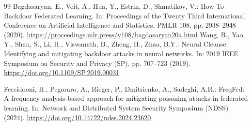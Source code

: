 \documentclass[runningheads,orivec]{llncs}
\begin{document}
\begin{thebibliography}{99}
     Bagdasaryan, E., Veit, A., Hua, Y., Estrin, D., Shmatikov, V.: How To Backdoor Federated Learning. In: Proceedings of the Twenty Third International Conference on Artificial Intelligence and Statistics, PMLR 108, pp. 2938--2948 (2020). \url{https://proceedings.mlr.press/v108/bagdasaryan20a.html}
     Wang, B., Yao, Y., Shan, S., Li, H., Viswanath, B., Zheng, H., Zhao, B.Y.: Neural Cleanse: Identifying and mitigating backdoor attacks in neural networks. In: 2019 IEEE Symposium on Security and Privacy (SP), pp. 707--723 (2019). \url{https://doi.org/10.1109/SP.2019.00031}

     Fereidooni, H., Pegoraro, A., Rieger, P., Dmitrienko, A., Sadeghi, A.R.: FreqFed: A frequency analysis-based approach for mitigating poisoning attacks in federated learning. In: Network and Distributed System Security Symposium (NDSS) (2024). \url{https://doi.org/10.14722/ndss.2024.23620}

\end{thebibliography}
\endgroup
\end{document}
